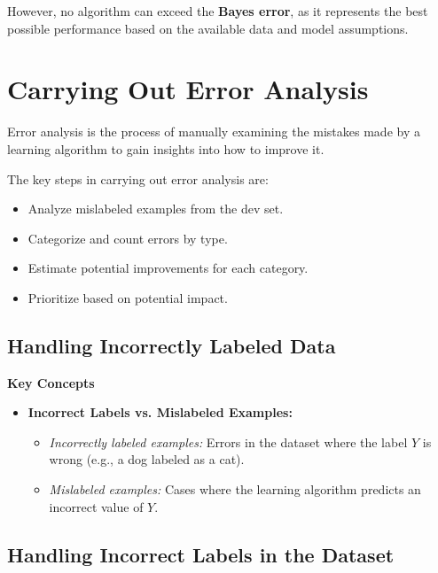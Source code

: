 \documentclass[letterpaper,12pt,notitlepage,twoside]{report}
\begin{document}
However, no algorithm can exceed the \textbf{Bayes error}, as it represents the best possible performance based on the available data and model assumptions.

\section{Carrying Out Error Analysis}
Error analysis is the process of manually examining the mistakes made by a learning algorithm to gain insights into how to improve it.

The key steps in carrying out error analysis are:
\begin{itemize}[noitemsep, topsep=0pt]
    \item Analyze mislabeled examples from the dev set.
    \item Categorize and count errors by type.
    \item Estimate potential improvements for each category.
    \item Prioritize based on potential impact.
\end{itemize}

\subsection{Handling Incorrectly Labeled Data}
\textbf{Key Concepts}
\begin{itemize}
    \item \textbf{Incorrect Labels vs. Mislabeled Examples:}
    \begin{itemize}
        \item \textit{Incorrectly labeled examples:} Errors in the dataset where the label $Y$ is wrong (e.g., a dog labeled as a cat).
        \item \textit{Mislabeled examples:} Cases where the learning algorithm predicts an incorrect value of $Y$.
    \end{itemize}
\end{itemize}

\subsection*{Handling Incorrect Labels in the Dataset}
\end{document}
